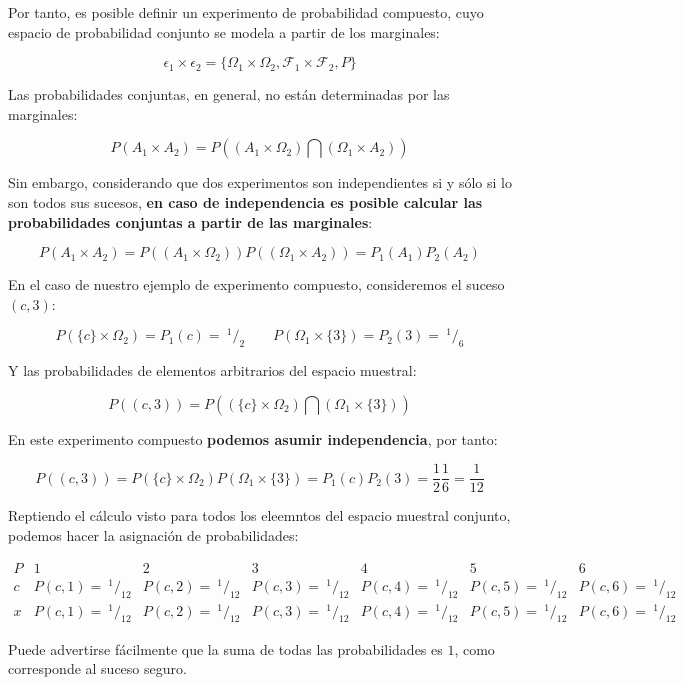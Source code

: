 \documentclass[11pt]{article}
\begin{document}
    Por tanto, es posible definir un experimento de probabilidad compuesto,
cuyo espacio de probabilidad conjunto se modela a partir de los
marginales:

\[\epsilon_1 \times \epsilon_2 =\{\Omega_1 \times \Omega_2, \mathscr{F}_1\times \mathscr{F}_2, P \}\]

Las probabilidades conjuntas, en general, no están determinadas por las
marginales:

\[P(A_1 \times A_2) = P((A_1 \times \Omega_2) \bigcap (\Omega_1 \times A_2))\]

Sin embargo, considerando que dos experimentos son independientes si y
sólo si lo son todos sus sucesos, \textbf{en caso de independencia es
posible calcular las probabilidades conjuntas a partir de las
marginales}:

\[P(A_1 \times A_2) = P((A_1 \times \Omega_2)) P((\Omega_1 \times A_2))= P_1(A_1)P_2(A_2)\]

    En el caso de nuestro ejemplo de experimento compuesto, consideremos el
suceso \((c,3)\):

\[P(\{c\}\times \Omega_2)= P_1(c) =\ ^1/_2 \qquad P(\Omega_1 \times \{3\}) = P_2(3)=\ ^1/_6\]

Y las probabilidades de elementos arbitrarios del espacio muestral:

\[P((c,3))= P((\{c\}\times\Omega_2) \bigcap (\Omega_1 \times \{3\}))\]

En este experimento compuesto \textbf{podemos asumir independencia}, por
tanto:

\[P((c,3)) = P(\{c\}\times \Omega_2) P(\Omega_1\times\{3\})=P_1(c)P_2(3)=\frac{1}{2}\frac{1}{6}=\frac{1}{12}\]

    Reptiendo el cálculo visto para todos los eleemntos del espacio muestral
conjunto, podemos hacer la asignación de probabilidades:

\[
\begin{array}{c|cccccccc|c}
  P & 1 & 2 & 3 & 4 & 5 & 6 & \\ 
  \hline
  c & P(c,1) = \ ^1/_{12} & P(c,2) = \ ^1/_{12} & P(c,3) = \ ^1/_{12} & P(c,4) = \ ^1/_{12} & P(c,5) = \ ^1/_{12} & P(c,6) = \ ^1/_{12} &  \\
  \hline
  x & P(c,1) = \ ^1/_{12} & P(c,2) = \ ^1/_{12} & P(c,3) = \ ^1/_{12} & P(c,4) = \ ^1/_{12} & P(c,5) = \ ^1/_{12} & P(c,6) = \ ^1/_{12} & 
 \end{array}
\]

Puede advertirse fácilmente que la suma de todas las probabilidades es
\(1\), como corresponde al suceso seguro.
\end{document}
